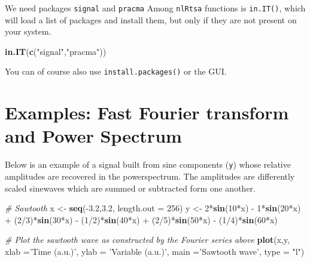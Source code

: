\documentclass[]{book}
\newenvironment{Shaded}{\begin{snugshade}}{\end{snugshade}}
\newcommand{\KeywordTok}[1]{\textcolor[rgb]{0.13,0.29,0.53}{\textbf{{#1}}}}
\newcommand{\DataTypeTok}[1]{\textcolor[rgb]{0.13,0.29,0.53}{{#1}}}
\newcommand{\DecValTok}[1]{\textcolor[rgb]{0.00,0.00,0.81}{{#1}}}
\newcommand{\FloatTok}[1]{\textcolor[rgb]{0.00,0.00,0.81}{{#1}}}
\newcommand{\StringTok}[1]{\textcolor[rgb]{0.31,0.60,0.02}{{#1}}}
\newcommand{\CommentTok}[1]{\textcolor[rgb]{0.56,0.35,0.01}{\textit{{#1}}}}
\newcommand{\NormalTok}[1]{{#1}}
\let\stdsection\section
\renewcommand\section{\newpage\stdsection}
\begin{document}
We need packages \texttt{signal} and \texttt{pracma} Among
\texttt{nlRtsa} functions is \texttt{in.IT()}, which will load a list of
packages and install them, but only if they are not present on your
system.

\begin{Shaded}
\begin{Highlighting}[]
\KeywordTok{in.IT}\NormalTok{(}\KeywordTok{c}\NormalTok{(}\StringTok{"signal"}\NormalTok{,}\StringTok{"pracma"}\NormalTok{))}
\end{Highlighting}
\end{Shaded}

You can of course also use \texttt{install.packages()} or the GUI.

\section*{Examples: Fast Fourier transform and Power
Spectrum}\label{examples-fast-fourier-transform-and-power-spectrum}

Below is an example of a signal built from sine components (\texttt{y})
whose relative amplitudes are recovered in the powerspectrum. The
amplitudes are differently scaled sinewaves which are summed or
subtracted form one another.

\begin{Shaded}
\begin{Highlighting}[]
\CommentTok{# Sawtooth}
\NormalTok{x <-}\StringTok{ }\KeywordTok{seq}\NormalTok{(-}\FloatTok{3.2}\NormalTok{,}\FloatTok{3.2}\NormalTok{, }\DataTypeTok{length.out =} \DecValTok{256}\NormalTok{)}
\NormalTok{y <-}\StringTok{ }\DecValTok{2}\NormalTok{*}\KeywordTok{sin}\NormalTok{(}\DecValTok{10}\NormalTok{*x) -}\StringTok{ }\DecValTok{1}\NormalTok{*}\KeywordTok{sin}\NormalTok{(}\DecValTok{20}\NormalTok{*x) +}\StringTok{ }\NormalTok{(}\DecValTok{2}\NormalTok{/}\DecValTok{3}\NormalTok{)*}\KeywordTok{sin}\NormalTok{(}\DecValTok{30}\NormalTok{*x) -}\StringTok{ }\NormalTok{(}\DecValTok{1}\NormalTok{/}\DecValTok{2}\NormalTok{)*}\KeywordTok{sin}\NormalTok{(}\DecValTok{40}\NormalTok{*x) +}\StringTok{ }\NormalTok{(}\DecValTok{2}\NormalTok{/}\DecValTok{5}\NormalTok{)*}\KeywordTok{sin}\NormalTok{(}\DecValTok{50}\NormalTok{*x) -}\StringTok{ }\NormalTok{(}\DecValTok{1}\NormalTok{/}\DecValTok{4}\NormalTok{)*}\KeywordTok{sin}\NormalTok{(}\DecValTok{60}\NormalTok{*x)}

\CommentTok{# Plot the sawtooth wave as constructed by the Fourier series above}
\KeywordTok{plot}\NormalTok{(x,y, }\DataTypeTok{xlab =}\StringTok{'Time (a.u.)'}\NormalTok{, }\DataTypeTok{ylab =} \StringTok{'Variable (a.u.)'}\NormalTok{, }\DataTypeTok{main =}\StringTok{'Sawtooth wave'}\NormalTok{, }\DataTypeTok{type =} \StringTok{"l"}\NormalTok{)}
\end{Highlighting}
\end{Shaded}
\end{document}
